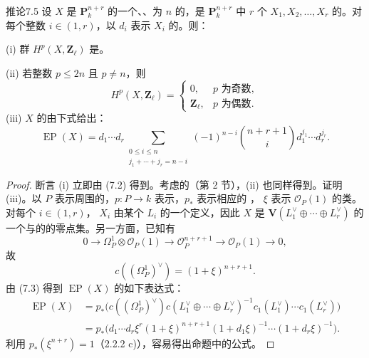 \begin{SGAresult}{推论}{7.5}
设 $X$ 是 $\mathbf P_k^{n+r}$ 的一个、、为 $n$ 的，是 $\mathbf P_k^{n+r}$ 中 $r$ 个 $X_1,X_2,\ldots,X_r$ 的。对每个整数 $i\in(1,r)$，以 $d_i$ 表示 $X_i$ 的。则：

(i) 群 $H^p(X,\mathbf Z_\ell)$ 是。

(ii) 若整数 $p\le2n$ 且 $p\ne n$，则
\[
 H^p(X,\mathbf Z_\ell)=
 \begin{cases}
 0,&p\text{ 为奇数},\\
 \mathbf Z_\ell,&p\text{ 为偶数}.
 \end{cases}
\]
(iii) $X$ 的由下式给出：
\[
 \operatorname{EP}(X)=d_1\cdots d_r
 \sum_{\substack{0\le i\le n\\j_1+\cdots+j_r=n-i}}
 (-1)^{n-i}\binom{n+r+1}{i}d_1^{j_1}\cdots d_r^{j_r}.
\]
\end{SGAresult}
\begin{proof}
断言 (i) 立即由 (7.2) 得到。考虑的（第 2 节），(ii) 也同样得到。证明 (iii)。以 $P$ 表示周围的，$p:P\to k$ 表示，$p_*$ 表示相应的 ，
$\xi$ 表示 $\mathscr O_P(1)$ 的类。对每个 $i\in(1,r)$， $X_i$ 由某个 $L_i$ 的一个定义，因此 $X$ 是 $\mathbf V(L_1^\vee\oplus\cdots\oplus L_r^\vee)$ 的一个与的的零点集。另一方面，已知有
\[
 0\longrightarrow\Omega_P^1\otimes\mathscr O_P(1)
 \longrightarrow\mathscr O_P^{n+r+1}\longrightarrow\mathscr O_P(1)\longrightarrow0,
\]
故
\[
 c((\Omega_P^1)^\vee)=(1+\xi)^{n+r+1}.
\]
由 (7.3) 得到 $\operatorname{EP}(X)$ 的如下表达式：
\[
 \begin{split}
 \operatorname{EP}(X)
 &=p_*\bigl(c((\Omega_P^1)^\vee)c(L_1^\vee\oplus\cdots\oplus L_r^\vee)^{-1}
 c_1(L_1^\vee)\cdots c_1(L_r^\vee)\bigr)\\
 &=p_*\bigl(d_1\cdots d_r\xi^r(1+\xi)^{n+r+1}
 (1+d_1\xi)^{-1}\cdots(1+d_r\xi)^{-1}\bigr).
 \end{split}
\]
利用 $p_*(\xi^{n+r})=1$（2.2.2 c)），容易得出命题中的公式。
\end{proof}

